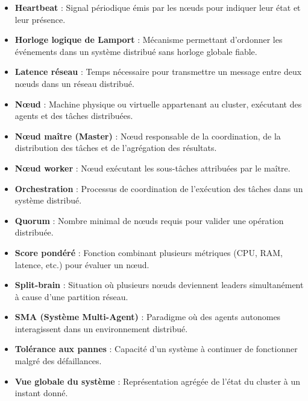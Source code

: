 \documentclass[12pt,a4paper]{report}
\begin{document}
\begin{itemize}
\item[*] \textbf{Heartbeat} : Signal périodique émis par les nœuds pour indiquer leur état et leur présence.

\item[*] \textbf{Horloge logique de Lamport} : Mécanisme permettant d’ordonner les événements dans un système distribué sans horloge globale fiable.

\item[*] \textbf{Latence réseau} : Temps nécessaire pour transmettre un message entre deux nœuds dans un réseau distribué.

\item[*] \textbf{Nœud} : Machine physique ou virtuelle appartenant au cluster, exécutant des agents et des tâches distribuées.

\item[*] \textbf{Nœud maître (Master)} : Nœud responsable de la coordination, de la distribution des tâches et de l’agrégation des résultats.

\item[*] \textbf{Nœud worker} : Nœud exécutant les sous-tâches attribuées par le maître.

\item[*] \textbf{Orchestration} : Processus de coordination de l’exécution des tâches dans un système distribué.

\item[*] \textbf{Quorum} : Nombre minimal de nœuds requis pour valider une opération distribuée.

\item[*] \textbf{Score pondéré} : Fonction combinant plusieurs métriques (CPU, RAM, latence, etc.) pour évaluer un nœud.

\item[*] \textbf{Split-brain} : Situation où plusieurs nœuds deviennent leaders simultanément à cause d’une partition réseau.

\item[*] \textbf{SMA (Système Multi-Agent)} : Paradigme où des agents autonomes interagissent dans un environnement distribué.

\item[*] \textbf{Tolérance aux pannes} : Capacité d’un système à continuer de fonctionner malgré des défaillances.

\item[*] \textbf{Vue globale du système} : Représentation agrégée de l’état du cluster à un instant donné.

\end{itemize}
\end{document}
